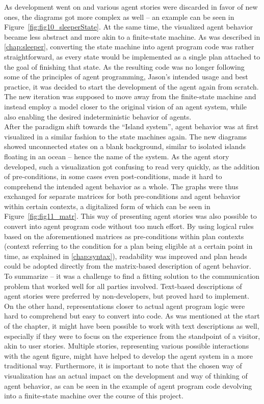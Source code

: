 \documentclass[draft,final]{vutinfth} %
\begin{document}
As development went on and various agent stories were discarded in favor of new ones, the diagrams got more complex as well – an example can be seen in Figure~\ref{fig:fig10_sleeperState}. 
At the same time, the visualized agent behavior became less abstract and more akin to a finite-state machine. 
As was described in \autoref{chap:sleeper}, converting the state machine into agent program code was rather straightforward, as every state would be implemented as a single plan attached to the goal of finishing that state. 
As the resulting code was no longer following some of the principles of agent programming, Jason’s intended usage and best practice, it was decided to start the development of the agent again from scratch. 
The new iteration was supposed to move away from the finite-state machine and instead employ a model closer to the original vision of an agent system, while also enabling the desired indeterministic behavior of agents. \\
After the paradigm shift towards the “Island system”, agent behavior was at first visualized in a similar fashion to the state machines again. 
The new diagrams showed unconnected states on a blank background, similar to isolated islands floating in an ocean – hence the name of the system. 
As the agent story developed, such a visualization got confusing to read very quickly, as the addition of pre-conditions, in some cases even post-conditions, made it hard to comprehend the intended agent behavior as a whole. 
The graphs were thus exchanged for separate matrices for both pre-conditions and agent behavior within certain contexts, a digitalized form of which can be seen in Figure~\ref{fig:fig11_matr}. 
This way of presenting agent stories was also possible to convert into agent program code without too much effort. 
By using logical rules based on the aforementioned matrices as pre-conditions within plan contexts (context referring to the condition for a plan being eligible at a certain point in time, as explained in \autoref{chap:syntax}), readability was improved and plan heads could be adopted directly from the matrix-based description of agent behavior. \\
To summarize – it was a challenge to find a fitting solution to the communication problem that worked well for all parties involved. 
Text-based descriptions of agent stories were preferred by non-developers, but proved hard to implement. 
On the other hand, representations closer to actual agent program logic were hard to comprehend but easy to convert into code. 
As was mentioned at the start of the chapter, it might have been possible to work with text descriptions as well, especially if they were to focus on the experience from the standpoint of a visitor, akin to user stories.
Multiple stories, representing various possible interactions with the agent figure, might have helped to develop the agent system in a more traditional way. 
Furthermore, it is important to note that the chosen way of visualization has an actual impact on the development and way of thinking of agent behavior, as can be seen in the example of agent program code devolving into a finite-state machine over the course of this project.
\end{document}
